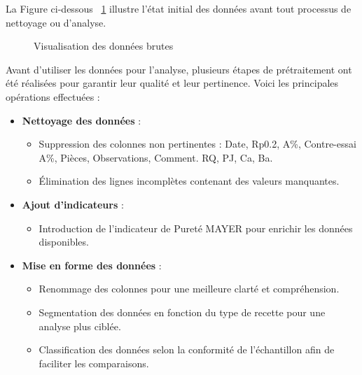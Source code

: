 \documentclass[12pt]{article}
\begin{document}
La Figure ci-dessous ~\ref{fig:donnees_brutes}  illustre l'état initial des données avant tout 
processus de nettoyage ou d'analyse.


\begin{figure}[H]
    \centering
    \caption{Visualisation des données brutes}
    \label{fig:donnees_brutes}
\end{figure}





Avant d'utiliser les données pour l'analyse, plusieurs étapes de 
prétraitement ont été réalisées pour garantir leur qualité et leur 
pertinence. Voici les principales opérations effectuées :

\begin{itemize}
    \item \textbf{Nettoyage des données} :
    \begin{itemize}
        \item Suppression des colonnes non pertinentes : Date, Rp0.2, A\%, Contre-essai A\%, Pièces, Observations, Comment. RQ, PJ, Ca, Ba.
        \item Élimination des lignes incomplètes contenant des valeurs manquantes.
    \end{itemize}

    \vspace{0.5cm}

    
    \item \textbf{Ajout d'indicateurs} :
    \begin{itemize}
        \item Introduction de l'indicateur de Pureté MAYER pour enrichir les données disponibles.
    \end{itemize}

    
    \vspace{0.5cm}
    
    \item \textbf{Mise en forme des données} :
    \begin{itemize}
        \item Renommage des colonnes pour une meilleure clarté et compréhension.
        \item Segmentation des données en fonction du type de recette pour une analyse plus ciblée.
        \item Classification des données selon la conformité de l'échantillon afin de faciliter les comparaisons.
    \end{itemize}
\end{itemize}
\end{document}
